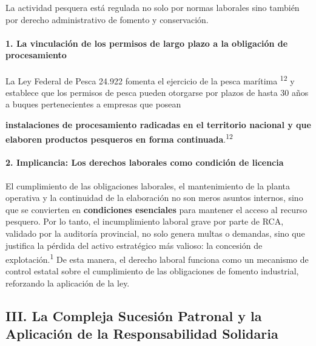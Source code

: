 \documentclass[]{article}
\begin{document}
La actividad pesquera está regulada no solo por normas laborales sino
también por derecho administrativo de fomento y conservación.

\hypertarget{la-vinculaciuxf3n-de-los-permisos-de-largo-plazo-a-la-obligaciuxf3n-de-procesamiento}{%
\paragraph{1. La vinculación de los permisos de largo plazo a la
obligación de
procesamiento}\label{la-vinculaciuxf3n-de-los-permisos-de-largo-plazo-a-la-obligaciuxf3n-de-procesamiento}}

La Ley Federal de Pesca 24.922 fomenta el ejercicio de la pesca marítima
\textsuperscript{12} y establece que los permisos de pesca pueden
otorgarse por plazos de hasta 30 años a buques pertenecientes a empresas
que posean

\textbf{instalaciones de procesamiento radicadas en el territorio
nacional y que elaboren productos pesqueros en forma
continuada}.\textsuperscript{12}

\hypertarget{implicancia-los-derechos-laborales-como-condiciuxf3n-de-licencia}{%
\paragraph{2. Implicancia: Los derechos laborales como condición de
licencia}\label{implicancia-los-derechos-laborales-como-condiciuxf3n-de-licencia}}

El cumplimiento de las obligaciones laborales, el mantenimiento de la
planta operativa y la continuidad de la elaboración no son meros asuntos
internos, sino que se convierten en \textbf{condiciones esenciales} para
mantener el acceso al recurso pesquero. Por lo tanto, el incumplimiento
laboral grave por parte de RCA, validado por la auditoría provincial, no
solo genera multas o demandas, sino que justifica la pérdida del activo
estratégico más valioso: la concesión de explotación.\textsuperscript{1}
De esta manera, el derecho laboral funciona como un mecanismo de control
estatal sobre el cumplimiento de las obligaciones de fomento industrial,
reforzando la aplicación de la ley.

\hypertarget{iii.-la-compleja-sucesiuxf3n-patronal-y-la-aplicaciuxf3n-de-la-responsabilidad-solidaria}{%
\subsection{III. La Compleja Sucesión Patronal y la Aplicación de la
Responsabilidad
Solidaria}\label{iii.-la-compleja-sucesiuxf3n-patronal-y-la-aplicaciuxf3n-de-la-responsabilidad-solidaria}}
\end{document}
